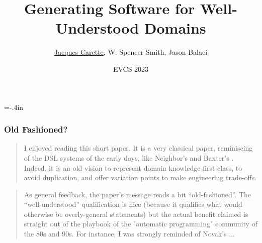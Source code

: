 \documentclass[usenames,dvipsnames]{beamer}
\title{\textbf{Generating Software for Well-Understood Domains}}
\author{\underline{Jacques Carette}, W. Spencer Smith, Jason Balaci}
\institute[McMaster University]
{
  Computing and Software Department\\
  McMaster University
}
\date[EVCS 2023] %
{EVCS 2023}
\newcommand{\name}[1]{{\color{blue}{#1}}}
\begin{document}
\hoffset=-.4in %
\begin{frame}[plain]


\titlepage

\end{frame}
\hoffset=0in %

\begin{frame}

\frametitle{Old Fashioned?}

\blockquote[][\\ \hfill-- \textbf{Referee 2}]{
\footnotesize{
I enjoyed reading this short paper. It is a very classical paper, reminiscing
of the DSL systems of the early days, like Neighbor's 
\name{Draco} and Baxter's \name{DMS}.
Indeed, it is an old vision to represent domain knowledge first-class, to avoid
duplication, and offer variation points to make engineering trade-offs.}
}

\vspace*{5mm}
\blockquote[][\hfill -- \textbf{Referee 3}]{
\footnotesize{
As general feedback, the paper's message reads a bit ``old-fashioned''. The
``well-understood'' qualification is nice (because it qualifies what would
otherwise be overly-general statements) but the actual benefit claimed is
straight out of the playbook of the "automatic programming" community of the
80s and 90s. For instance, I was strongly reminded of Novak's 
\name{GLisp}...}
}

\end{frame}
\end{document}
